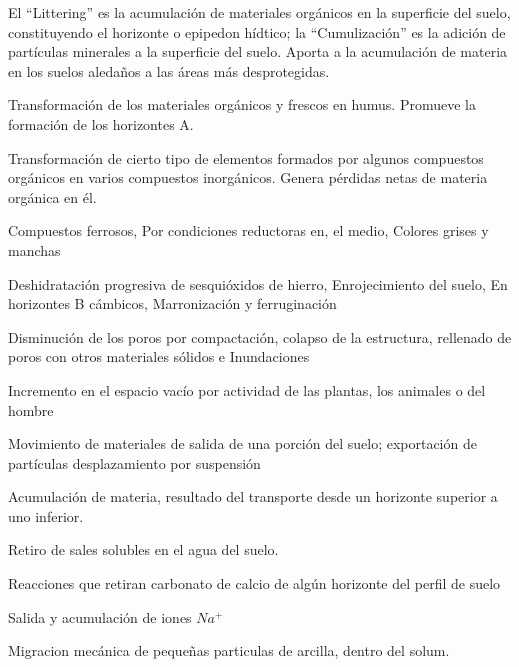 El ``Littering'' es la acumulación de materiales orgánicos en la superficie del suelo, constituyendo el horizonte o epipedon hídtico; la ``Cumulización'' es la adición de partículas minerales a la superficie del suelo. Aporta a la acumulación de materia en los suelos aledaños a las áreas más desprotegidas.

\begin{definition}[Humificación]
    Transformación de los materiales orgánicos y frescos en humus.
Promueve la formación de los horizontes A.
\end{definition}

\begin{definition}[Mineralización]
    Transformación de cierto tipo de elementos formados por algunos compuestos orgánicos en varios compuestos inorgánicos.
Genera pérdidas netas de materia orgánica en él.
\end{definition}
\begin{definition}[Gleización]
    Compuestos ferrosos, Por condiciones reductoras en, el medio, Colores grises y manchas
\end{definition}
\begin{definition}[Rubefacción]
    Deshidratación progresiva de sesquióxidos de hierro, Enrojecimiento del suelo, En horizontes B cámbicos, Marronización y ferruginación
\end{definition}
\begin{definition}[Endurecimiento]
    Disminución de los poros por compactación, colapso de la estructura, rellenado de poros con otros materiales sólidos e Inundaciones
\end{definition}
\begin{definition}[Esponjamiento]
    Incremento en el espacio vacío por actividad de las plantas, los animales o del hombre
\end{definition}
\begin{definition}[Eluviación]
    Movimiento de materiales de salida de una porción del suelo; exportación de partículas desplazamiento por suspensión    
\end{definition}
\begin{definition}[Iluviación]
    Acumulación de materia, resultado del transporte desde un horizonte superior a uno inferior.
\end{definition}
\begin{definition}[Desalinización]
    Retiro de sales solubles en el agua del suelo.
\end{definition}
\begin{definition}[Decalcificación]
    Reacciones que retiran carbonato de calcio de algún horizonte del perfil de suelo
\end{definition}
\begin{definition}[Desalcalinización]
    Salida y acumulación de iones $Na^+$
\end{definition}
\begin{definition}[Lessivage]
    Migracion mecánica de pequeñas particulas de arcilla, dentro del solum.
\end{definition}

